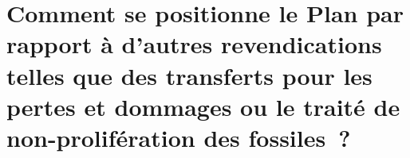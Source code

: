 \documentclass[a5paper,french,openany]{memoir}
\begin{document}




\section*{\normalsize Comment se positionne le Plan par rapport à d'autres revendications telles que des transferts pour les pertes et dommages ou le traité de non-prolifération des fossiles~?}\label{q:climate_movt}
\end{document}
